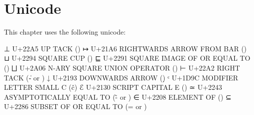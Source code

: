 \hypertarget{unicode}{%
\section{Unicode}\label{unicode}}

This chapter uses the following unicode:

\begin{myDisplay}
⊥  U+22A5  UP TACK (\bot)
↦  U+21A6  RIGHTWARDS ARROW FROM BAR (\mapsto)
⊔  U+2294  SQUARE CUP (\lub)
⊑  U+2291  SQUARE IMAGE OF OR EQUAL TO (\sqsubseteq)
⨆ U+2A06  N-ARY SQUARE UNION OPERATOR (\Lub)
⊢  U+22A2  RIGHT TACK (\|- or \vdash)
↓  U+2193  DOWNWARDS ARROW (\d)
ᶜ  U+1D9C  MODIFIER LETTER SMALL C (\^c)
ℰ  U+2130  SCRIPT CAPITAL E (\McE)
≃  U+2243  ASYMPTOTICALLY EQUAL TO (\~- or \simeq)
∈  U+2208  ELEMENT OF (\in)
⊆  U+2286  SUBSET OF OR EQUAL TO (\sub= or \subseteq)
\end{myDisplay}

